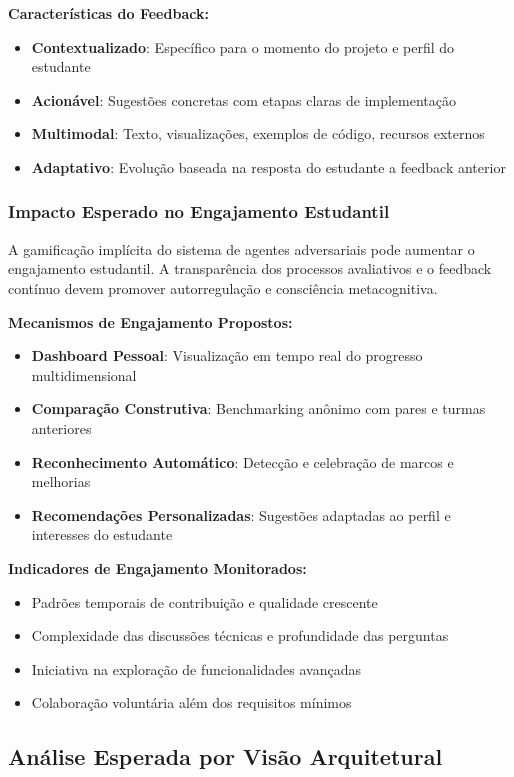 \documentclass[english, spanish, brazilian]{modelo_dt}
\begin{document}
\textbf{Características do Feedback:}
\begin{itemize}
\item \textbf{Contextualizado}: Específico para o momento do projeto e perfil do estudante
\item \textbf{Acionável}: Sugestões concretas com etapas claras de implementação
\item \textbf{Multimodal}: Texto, visualizações, exemplos de código, recursos externos
\item \textbf{Adaptativo}: Evolução baseada na resposta do estudante a feedback anterior
\end{itemize}

\subsubsection{Impacto Esperado no Engajamento Estudantil}

A gamificação implícita do sistema de agentes adversariais pode aumentar o engajamento estudantil. A transparência dos processos avaliativos e o feedback contínuo devem promover autorregulação e consciência metacognitiva.

\textbf{Mecanismos de Engajamento Propostos:}
\begin{itemize}
\item \textbf{Dashboard Pessoal}: Visualização em tempo real do progresso multidimensional
\item \textbf{Comparação Construtiva}: Benchmarking anônimo com pares e turmas anteriores
\item \textbf{Reconhecimento Automático}: Detecção e celebração de marcos e melhorias
\item \textbf{Recomendações Personalizadas}: Sugestões adaptadas ao perfil e interesses do estudante
\end{itemize}

\textbf{Indicadores de Engajamento Monitorados:}
\begin{itemize}
\item Padrões temporais de contribuição e qualidade crescente
\item Complexidade das discussões técnicas e profundidade das perguntas
\item Iniciativa na exploração de funcionalidades avançadas
\item Colaboração voluntária além dos requisitos mínimos
\end{itemize}

\subsection{Análise Esperada por Visão Arquitetural}
\end{document}
